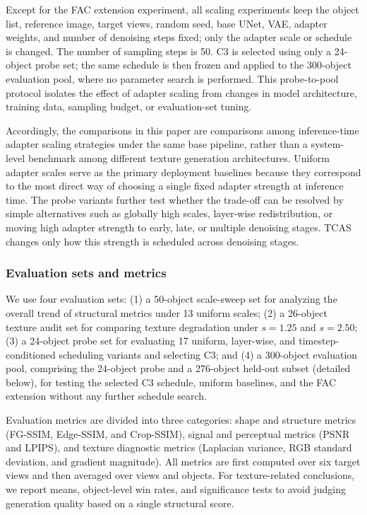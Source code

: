 \documentclass[times,twocolumn,final]{elsarticle}
\begin{document}
Except for the FAC extension experiment, all scaling experiments keep the object list, reference image, target views, random seed, base UNet, VAE, adapter weights, and number of denoising steps fixed; only the adapter scale or schedule is changed. The number of sampling steps is 50. C3 is selected using only a 24-object probe set; the same schedule is then frozen and applied to the 300-object evaluation pool, where no parameter search is performed. This probe-to-pool protocol isolates the effect of adapter scaling from changes in model architecture, training data, sampling budget, or evaluation-set tuning.

Accordingly, the comparisons in this paper are comparisons among inference-time adapter scaling strategies under the same base pipeline, rather than a system-level benchmark among different texture generation architectures. Uniform adapter scales serve as the primary deployment baselines because they correspond to the most direct way of choosing a single fixed adapter strength at inference time. The probe variants further test whether the trade-off can be resolved by simple alternatives such as globally high scales, layer-wise redistribution, or moving high adapter strength to early, late, or multiple denoising stages. TCAS changes only how this strength is scheduled across denoising stages.

\subsubsection{Evaluation sets and metrics}

We use four evaluation sets: (1) a 50-object scale-sweep set for analyzing the overall trend of structural metrics under 13 uniform scales; (2) a 26-object texture audit set for comparing texture degradation under $s = 1.25$ and $s = 2.50$; (3) a 24-object probe set for evaluating 17 uniform, layer-wise, and timestep-conditioned scheduling variants and selecting C3; and (4) a 300-object evaluation pool, comprising the 24-object probe and a 276-object held-out subset (detailed below), for testing the selected C3 schedule, uniform baselines, and the FAC extension without any further schedule search.

Evaluation metrics are divided into three categories: shape and structure metrics (FG-SSIM, Edge-SSIM, and Crop-SSIM), signal and perceptual metrics (PSNR and LPIPS), and texture diagnostic metrics (Laplacian variance, RGB standard deviation, and gradient magnitude). All metrics are first computed over six target views and then averaged over views and objects. For texture-related conclusions, we report means, object-level win rates, and significance tests to avoid judging generation quality based on a single structural score.
\end{document}
